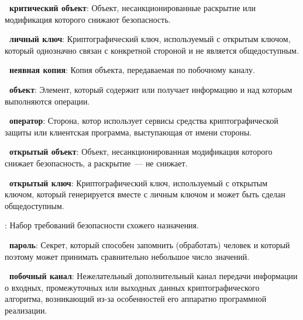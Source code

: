 
{\bf \thedefctr~критический объект}: 
Объект, несанкционированные раскрытие или модификация которого 
снижают безопасность.

{\bf \thedefctr~личный ключ}:
Криптографический ключ, используемый 
с открытым ключом, который однозначно связан с конкретной стороной и не 
является общедоступным.

{\bf \thedefctr~неявная копия}:
Копия объекта, передаваемая по побочному каналу.

{\bf \thedefctr~объект}: 
Элемент, который содержит или получает информацию
и над которым выполняются операции.

\begin{note}
\end{note}

{\bf \thedefctr~оператор}:
Сторона, котор использует сервисы средства криптографической 
защиты\addendum{,} или клиентская программа, выступающая от имени стороны.

{\bf \thedefctr~открытый объект}: 
Объект, несанкционированная модификация которого снижает безопасность, а
раскрытие~--- не снижает.

{\bf \thedefctr~открытый ключ}:
Криптографический ключ, используемый  
с открытым ключом, который генерируется вместе с личным ключом и может 
быть сделан общедоступным.


:
Набор требований безопасности схожего назначения.

{\bf \thedefctr~пароль}:
Секрет, который способен запомнить (обработать) человек и который
поэтому может принимать сравнительно небольшое число значений.

{\bf \thedefctr~побочный канал}:
Нежелательный дополнительный канал передачи информации о 
входных, промежуточных или выходных данных криптографического алгоритма,  
возникающий из-за особенностей его аппаратно программной 
реализации. 

